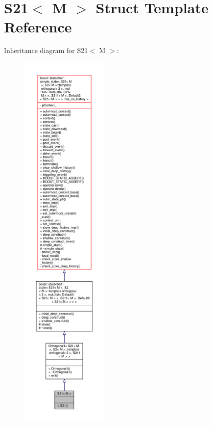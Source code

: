 \hypertarget{struct_s21}{}\section{S21$<$ M $>$ Struct Template Reference}
\label{struct_s21}


Inheritance diagram for S21$<$ M $>$\+:
\nopagebreak
\begin{figure}[H]
\begin{center}
\leavevmode
\includegraphics[height=550pt]{struct_s21__inherit__graph}
\end{center}
\end{figure}


